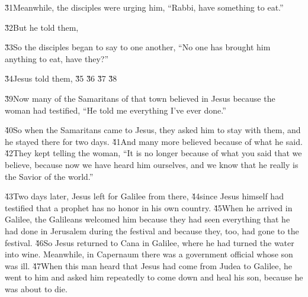 \v{31}Meanwhile, the disciples were urging him, ``Rabbi, have something to eat.''

\v{32}But he told them, 

\v{33}So the disciples began to say to one another, ``No one has brought him anything to eat, have they?''

\v{34}Jesus told them,  \v{35} \v{36} \v{37} \v{38}

\v{39}Now many of the Samaritans of that town believed in Jesus because the woman had testified, ``He told me everything I've ever done.''

\v{40}So when the Samaritans came to Jesus, they asked him to stay with them, and he stayed there for two days. \v{41}And many more believed because of what he said. \v{42}They kept telling the woman, ``It is no longer because of what you said that we believe, because now we have heard him ourselves, and we know that he really is the Savior of the world.''

\v{43}Two days later, Jesus left for Galilee from there, \v{44}since Jesus himself had testified that a prophet has no honor in his own country. \v{45}When he arrived in Galilee, the Galileans welcomed him because they had seen everything that he had done in Jerusalem during the festival and because they, too, had gone to the festival. \v{46}So Jesus returned to Cana in Galilee, where he had turned the water into wine. Meanwhile, in Capernaum there was a government official whose son was ill. \v{47}When this man heard that Jesus had come from Judea to Galilee, he went to him and asked him repeatedly to come down and heal his son, because he was about to die.

